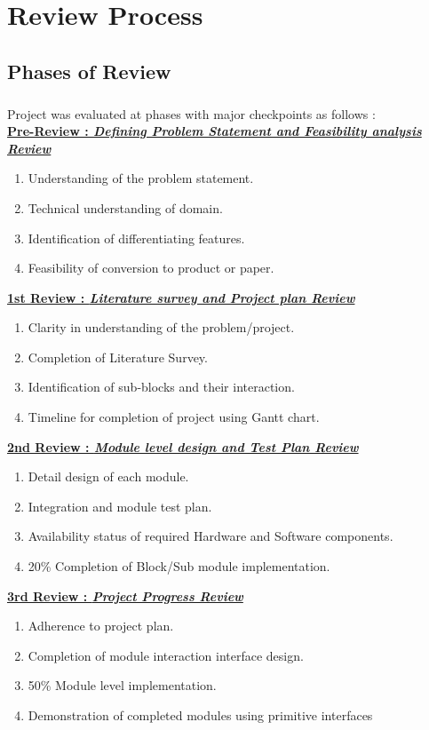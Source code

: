 \appendix
\chapter{Review Process}
\section{Phases of Review}
\paragraph{} Project was evaluated at phases with major checkpoints as follows :\\

\textbf {\underline{Pre-Review :  \textit{Defining Problem Statement and Feasibility analysis Review}}}
\begin{enumerate}
\item Understanding of the problem statement.  
\item Technical understanding of domain. 
\item Identification of differentiating features.
\item Feasibility of conversion to product or paper.
\end{enumerate}

\textbf {\underline{1st Review :  \textit{Literature survey and Project plan Review }}}
\begin{enumerate}
\item Clarity in understanding of the problem/project. 
\item Completion of Literature Survey. 
\item Identification of sub-blocks and their interaction.
\item Timeline for completion of project using Gantt chart.
\end{enumerate}

\textbf {\underline{2nd Review :  \textit{Module level design and Test Plan Review}}}
\begin{enumerate}
\item Detail design of each module. 
\item Integration and module test plan. 
\item Availability status of required Hardware and Software components.
\item 20\% Completion of Block/Sub module implementation.
\end{enumerate}
\newpage
    
\textbf {\underline{3rd Review :  \textit{Project Progress Review}}}
\begin{enumerate}
\item Adherence to project plan.
\item Completion of module interaction interface design.
\item 50\% Module level implementation.
\item Demonstration of completed modules using primitive interfaces 
\end{enumerate}

